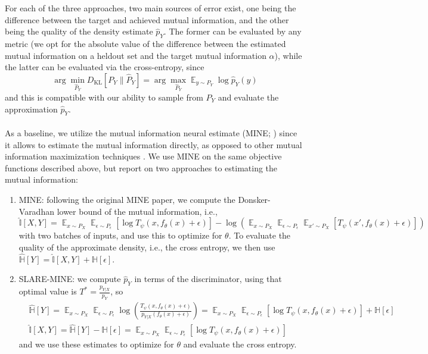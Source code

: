 \documentclass{NSF}
\newcommand{\E} {
    \mathop{\mathbb{E}}
}
\newcommand{\DKL} {
    D_{\mathrm{KL}}
}
\begin{document}
For each of the three approaches, two main sources of error exist, one being the
difference between the target and achieved mutual information, and the other being the
quality of the density estimate $\hat{p}_Y$. The former can be evaluated by any metric
(we opt for the absolute value of the difference between the estimated mutual
information on a heldout set and the target mutual information $\alpha$), while the
latter can be evaluated via the cross-entropy, since
\[
    \arg\min_{\hat{P}_Y} \DKL \left[P_Y \| \hat{P}_Y\right]
    = \arg\max_{\hat{P}_Y} \E_{y\sim P_Y} \log \hat{p}_Y(y)
\]
and this is compatible with our ability to sample from $P_Y$ and evaluate the
approximation $\hat{p}_Y$.
\\
\\
As a baseline, we utilize the mutual information neural estimate (MINE; \cite{belghazi2018mine}) since it allows to estimate the mutual information directly, as
opposed to other mutual information maximization techniques \citep{hjelm2018learning}.
We use MINE on the same objective functions described above, but report on two approaches
to estimating the mutual information:
\begin{enumerate}
\item MINE: following the original MINE paper, we compute the Donsker-Varadhan lower bound of
the mutual information, i.e.,
\[
    \hat{\mathbb{I}}[X,Y]
    = \E_{x\sim P_X} \E_{\epsilon\sim P_\epsilon} \left[
        \log T_\psi(x,f_\theta(x)+\epsilon)
      \right]
    - \log\left(
        \E_{x\sim P_X} \E_{\epsilon\sim P_\epsilon} \E_{x'\sim P_X} \left[
          T_\psi(x',f_\theta(x)+\epsilon)
        \right]
      \right)
\]
with two batches of inputs, and use this to optimize for $\theta$. To evaluate the quality of the approximate density, i.e., the cross entropy, we then use
$\hat{\mathbb{H}}[Y] = \hat{\mathbb{I}}[X,Y] + \mathbb{H}[\epsilon]$.
\item SLARE-MINE: we compute $\hat{p}_Y$ in terms of the discriminator, using that optimal value is
$T^*=\frac{p_{Y|X}}{p_Y}$, so
\begin{align*}
&\hat{\mathbb{H}}[Y]
= \E_{x\sim P_X} \E_{\epsilon\sim P_\epsilon} \log \left(\frac{T_\psi(x,f_\theta(x)+\epsilon)}{p_{Y|X}(f_\theta(x)+\epsilon)} \right)
= \E_{x\sim P_X} \E_{\epsilon\sim P_\epsilon} \left[\log T_\psi(x,f_\theta(x)+\epsilon) \right] + \mathbb{H}[\epsilon]
\\
&\hat{\mathbb{I}}[X,Y]
= \hat{\mathbb{H}}[Y] - \mathbb{H}[\epsilon]
= \E_{x\sim P_X} \E_{\epsilon\sim P_\epsilon} \left[\log T_\psi(x,f_\theta(x)+\epsilon)\right]
\end{align*}
and we use these estimates to optimize for $\theta$ and evaluate the cross entropy.
\end{enumerate}
\end{document}
